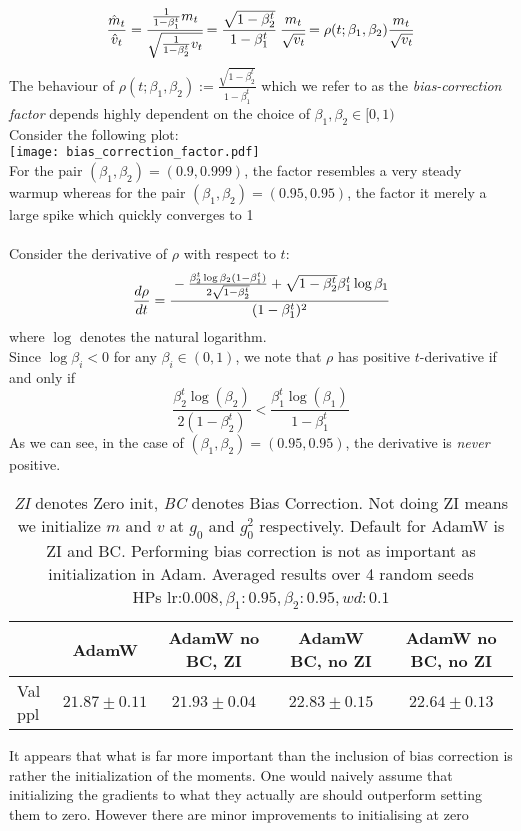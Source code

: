 \documentclass[12pt]{book}
\begin{document}
\begin{equation}
	\frac{\hat{m}_t}{\hat{v}_t} = \cfrac{\frac{1}{1-\beta_1^{t}} m_t}{\sqrt{ \frac{1}{1-\beta_2^{t}}v_t}} = \cfrac{\sqrt{1-\beta_2^{t}} }{1-\beta_1^{t}} \ \cfrac{m_t}{\sqrt{v_t} } = \rho(t; \beta_1, \beta_2) \frac{m_t}{\sqrt{v_t} }
	\label{eq: bias factor}
\end{equation}
The behaviour of $\rho(t;\beta_1,\beta_2) := \frac{\sqrt{1-\beta_2^{t}} }{1-\beta_1^{t}}$ which we refer to as the \textit{bias-correction factor} depends highly dependent on the choice of $\beta_1, \beta_2\in [0, 1)$ \\
Consider the following plot: \\
\texttt{[image: bias\_correction\_factor.pdf]}
\\
For the pair $(\beta_1, \beta_2) = (0.9, 0.999)$, the factor resembles a very steady warmup whereas for the pair $(\beta_1, \beta_2) = (0.95, 0.95)$, the factor it merely a large spike which quickly converges to 1\\
\\
Consider the derivative of $\rho$ with respect to $t$:
\begin{align*}
	\frac{d\rho}{dt} &= \cfrac{-\frac{\beta_2^{t}\log\beta_2(1-\beta_1^{t})}{2\sqrt{1-\beta_2^{t}}} + \sqrt{1-\beta_2^{t}} \beta_1^{t}\log\beta_1}{(1-\beta_1^{t})^2} \\
\end{align*}
where $\log$ denotes the natural logarithm. \\
Since $\log\beta_i < 0$ for any $\beta_i \in (0,1)$, we note that $\rho$ has positive $t$-derivative if and only if  
\[
\frac{\beta_2^{t}\log(\beta_2) }{2(1-\beta_2^{t})} < \frac{\beta_1^{t}\log(\beta_1)}{1-\beta_1^{t}}
\]
As we can see, in the case of $(\beta_1, \beta_2) = (0.95, 0.95)$, the derivative is \textit{never} positive. 
\begin{table}[h]
\centering
\caption{\textit{ZI} denotes Zero init, \textit{BC} denotes Bias Correction. Not doing ZI means we initialize $m$ and $v$ at $g_0$ and $g_0^2$ respectively. Default for AdamW is ZI and BC. Performing bias correction is not as important as initialization in Adam. Averaged results over 4 random seeds\\
HPs $\text{lr:}0.008, \beta_1:0.95, \beta_2: 0.95, wd:0.1$}
\vspace{0.5em}
\begin{tabular}{lcccc}
\toprule
& AdamW & AdamW no BC, ZI & AdamW BC, no ZI  &AdamW no BC, no ZI  \\
\midrule
Val ppl & $21.87 \pm 0.11$ & $21.93 \pm 0.04$ & $22.83 \pm 0.15$ & $22.64 \pm 0.13$  \\
\bottomrule
\end{tabular}
\end{table}
It appears that what is far more important than the inclusion of bias correction is rather the initialization of the moments. One would naively assume that initializing the gradients to what they actually are should outperform setting them to zero. However there are minor improvements to initialising at zero 
\end{document}
